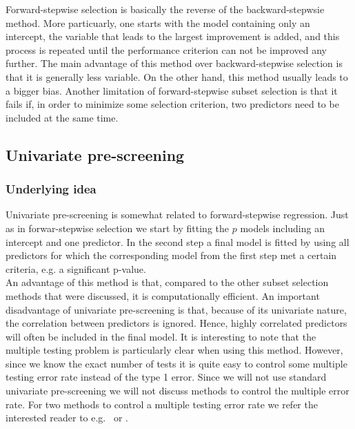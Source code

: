 Forward-stepwise selection is basically the reverse of the backward-stepwsie method. More particuarly, one starts with the model containing only an intercept, the variable that leads to the largest improvement is added, and this process is repeated until the performance criterion can not be improved any further. The main advantage of this method over backward-stepwise selection is that it is generally less variable. On the other hand, this method usually leads to a bigger bias. Another limitation of forward-stepwise subset selection is that it fails if, in order to minimize some selection criterion, two predictors need to be included at the same time.\\

\subsection{Univariate pre-screening}
\subsubsection{Underlying idea}
Univariate pre-screening is somewhat related to forward-stepwise regression. Just as in forwar-stepwise selection we start by fitting the $p$ models including an intercept and one predictor. In the second step a final model is fitted by using all predictors for which the corresponding model from the first step met a certain criteria, e.g. a significant p-value. \\

An advantage of this method is that, compared to the other subset selection methods that were discussed, it is computationally efficient. 
An important disadvantage of univariate pre-screening is that, because of its univariate nature, the correlation between predictors is ignored. Hence, highly correlated predictors will often be included in the final model. It is interesting to note that the multiple testing problem is particularly clear when using this method. However, since we know the exact number of tests it is quite easy to control some multiple testing error rate instead of the type 1 error. Since we will not use standard univariate pre-screening we will not discuss methods to control the multiple error rate. For two methods to control a multiple testing error rate we refer the interested reader to e.g.\ \cite{holm_simple_1979} or \cite{benjamini_controlling_1995}.

